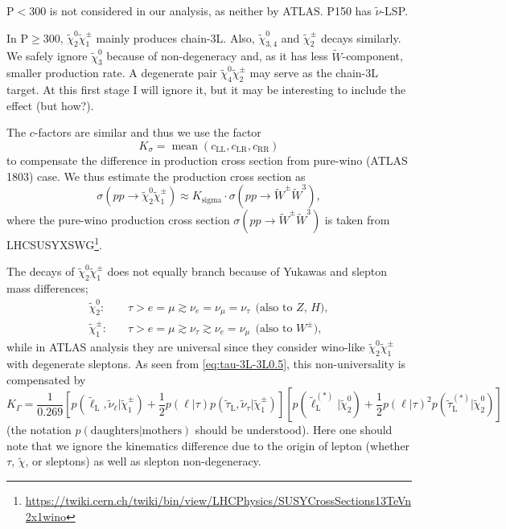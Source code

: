 \documentclass[a4paper,10pt,captions=tableheading,DIV=14]{scrartcl}
\numberwithin{equation}{section}
\newcommand\w[1]{_{\mathrm{#1}}}
\newcommand\neut  [1][\relax]{{\tilde\chi^0_{#1}}}
\newcommand\charPM[1][\relax]{{\tilde\chi^\pm_{#1}}}
\begin{document}
P$<$300 is not considered in our analysis, as neither by ATLAS. P150 has $\tilde\nu$-LSP.

In P$\ge$300, $\neut[2]\charPM[1]$ mainly produces chain-3L.
Also, $\neut[3,4]$ and $\charPM[2]$ decays similarly.
We safely ignore $\neut[3]$ because of non-degeneracy and, as it has less $\tilde W$-component, smaller production rate.
A degenerate pair $\neut[4]\charPM[2]$ may serve as the chain-3L target.
At this first stage I will ignore it, but it may be interesting to include the effect (but how?).

The $c$-factors are similar and thus we use the factor
\begin{equation}
 K_\sigma = \mathop{\mathrm{mean}}(c\w{LL},c\w{LR},c\w{RR})
\end{equation}
to compensate the difference in production cross section from pure-wino (ATLAS 1803) case.
We thus estimate the production cross section as
\begin{equation}
 \sigma(pp\to\neut[2]\charPM[1])\approx K\w{sigma}\cdot \sigma(pp\to\tilde W^\pm\tilde W^3),
\end{equation}
where the pure-wino production cross section $\sigma(pp\to\tilde W^\pm\tilde W^3)$ is taken from LHCSUSYXSWG\footnote{\url{https://twiki.cern.ch/twiki/bin/view/LHCPhysics/SUSYCrossSections13TeVn2x1wino}}.


The decays of $\neut[2]\charPM[1]$ does not equally branch because of Yukawas and slepton mass differences;
\begin{align}
 \neut[2]:&\quad\tau > e = \mu \gtrsim \nu_e = \nu_\mu=\nu_\tau ~~\text{(also to $Z$, $H$)},
\\
 \charPM[1]:&\quad\tau > e = \mu \gtrsim \nu_\tau\gtrsim \nu_e=\nu_\mu ~~\text{(also to $W^\pm$)},
\end{align}
while in ATLAS analysis they are universal since they consider wino-like $\neut[2]\charPM[1]$ with degenerate sleptons.
As seen from \cref{eq:tau-3L-3L0.5}, this non-universality is compensated by
\begin{equation}
 K_\Gamma = \frac{1}{0.269}
\left[
 p(\tilde\ell\w L,\tilde\nu_\ell|\charPM[1])
+ \frac12p(\ell|\tau)p(\tilde\tau\w L,\tilde\nu_\tau|\charPM[1])
\right]
\left[
 p(\tilde\ell\w L^{(*)}|\neut[2])
+ \frac12p(\ell|\tau)^2p(\tilde\tau\w L^{(*)}|\neut[2])
\right]
\end{equation}
(the notation $p(\text{daughters}|\text{mothers})$ should be understood).
Here one should note that we ignore the kinematics difference due to the origin of lepton (whether $\tau$, $\tilde\chi$, or sleptons) as well as slepton non-degeneracy.
\end{document}
